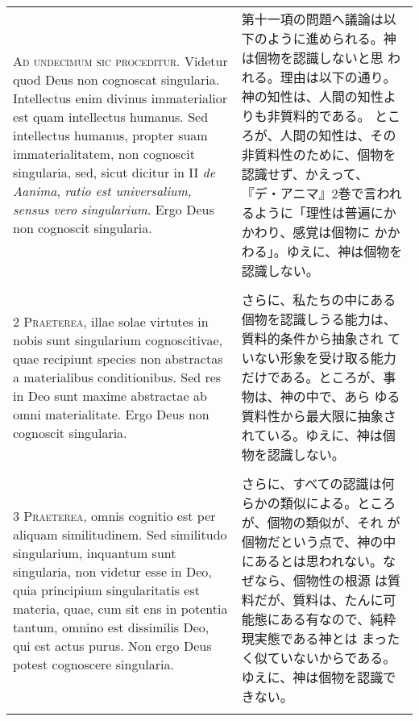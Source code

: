 \documentclass[10pt]{jsarticle} %
\begin{document}
\begin{longtable}{p{21em}p{21em}}



{\huge A}{\scshape d undecimum sic proceditur}. Videtur quod Deus non
cognoscat singularia. Intellectus enim divinus immaterialior est quam
intellectus humanus. Sed intellectus humanus, propter suam
immaterialitatem, non cognoscit singularia, sed, sicut dicitur in II
{\itshape de Aanima}, {\itshape ratio est universalium, sensus vero
singularium}. Ergo Deus non cognoscit singularia.


&

第十一項の問題へ議論は以下のように進められる。神は個物を認識しないと思
われる。理由は以下の通り。神の知性は、人間の知性よりも非質料的である。
ところが、人間の知性は、その非質料性のために、個物を認識せず、かえって、
『デ・アニマ』2巻で言われるように「理性は普遍にかかわり、感覚は個物に
かかわる」。ゆえに、神は個物を認識しない。

\\
\\

{\scshape 2 Praeterea}, illae solae virtutes in nobis sunt singularium
cognoscitivae, quae recipiunt species non abstractas a materialibus
conditionibus. Sed res in Deo sunt maxime abstractae ab omni
materialitate. Ergo Deus non cognoscit singularia.


&

さらに、私たちの中にある個物を認識しうる能力は、質料的条件から抽象され
ていない形象を受け取る能力だけである。ところが、事物は、神の中で、あら
ゆる質料性から最大限に抽象されている。ゆえに、神は個物を認識しない。

\\
\\

{\scshape 3 Praeterea}, omnis cognitio est per aliquam
similitudinem. Sed similitudo singularium, inquantum sunt singularia,
non videtur esse in Deo, quia principium singularitatis est materia,
quae, cum sit ens in potentia tantum, omnino est dissimilis Deo, qui
est actus purus. Non ergo Deus potest cognoscere singularia.


&

さらに、すべての認識は何らかの類似による。ところが、個物の類似が、それ
が個物だという点で、神の中にあるとは思われない。なぜなら、個物性の根源
は質料だが、質料は、たんに可能態にある有なので、純粋現実態である神とは
まったく似ていないからである。ゆえに、神は個物を認識できない。

\\
\\


\end{longtable}
\end{document}
